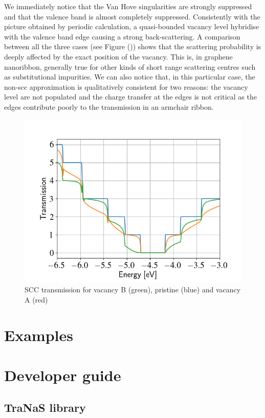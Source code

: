 \documentclass[a4paper,11pt,english]{sphinxmanual}
\begin{document}
{{We immediately notice that the Van Hove singularities are strongly
suppressed and that the valence band is almost completely
suppressed. Consistently with the picture obtained by periodic
calculation, a quasi-bounded vacancy level hybridise with the valence
band edge causing a strong back-scattering. A comparison between all
the three cases (see Figure {\hyperref[transport:fig-scc-tunn-comparison]{\emph{}}} ()) shows that
the scattering probability is deeply affected by the exact position of
the vacancy. This is, in graphene nanoribbon, generally true for other
kinds of short range scattering centres such as substitutional
impurities. We can also notice that, in this particular case, the
non-scc approximation is qualitatively consistent for two reasons: the
vacancy level are not populated and the charge transfer at the edges
is not critical as the edges contribute poorly to the transmission in
an armchair ribbon.
\begin{figure}[htbp]
\centering
\capstart
\includegraphics[width=0.700\linewidth]{scc-tunn-comparison.png}
\caption{SCC transmission for vacancy B (green), pristine (blue) and vacancy A (red)}\label{transport:fig-scc-tunn-comparison}\end{figure}

\part{Examples}

\part{Developer guide}

\chapter{{\bf\sffamily TraNaS} library}

}}
\end{document}

